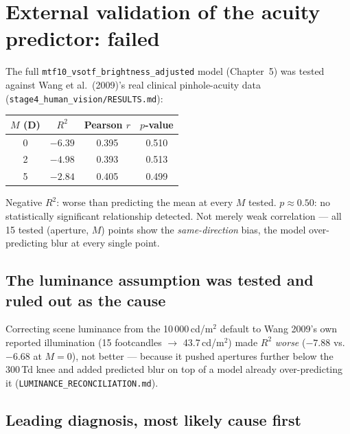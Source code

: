 \documentclass[11pt]{report}
\begin{document}
\section{External validation of the acuity predictor: failed}

The full \texttt{mtf10\_vsotf\_brightness\_adjusted} model (Chapter~5) was tested against
Wang et al.\ (2009)'s real clinical pinhole-acuity data
(\texttt{stage4\_human\_vision/RESULTS.md}):

\begin{center}
\begin{tabular}{cccc}
\toprule
$M$ (D) & $R^2$ & Pearson $r$ & $p$-value \\
\midrule
0 & $-6.39$ & 0.395 & 0.510 \\
2 & $-4.98$ & 0.393 & 0.513 \\
5 & $-2.84$ & 0.405 & 0.499 \\
\bottomrule
\end{tabular}
\end{center}

Negative $R^2$: worse than predicting the mean at every $M$ tested. $p\approx0.50$: no
statistically significant relationship detected. Not merely weak correlation --- all 15
tested (aperture, $M$) points show the \emph{same-direction} bias, the model
over-predicting blur at every single point.

\subsection{The luminance assumption was tested and ruled out as the cause}

Correcting scene luminance from the 10\,000\,cd/m$^2$ default to Wang 2009's own reported
illumination (15 footcandles $\to$ 43.7\,cd/m$^2$) made $R^2$ \emph{worse}
($-7.88$ vs.\ $-6.68$ at $M=0$), not better --- because it pushed apertures further below
the 300\,Td knee and added predicted blur on top of a model already over-predicting it
(\texttt{LUMINANCE\_RECONCILIATION.md}).

\subsection{Leading diagnosis, most likely cause first}
\end{document}

